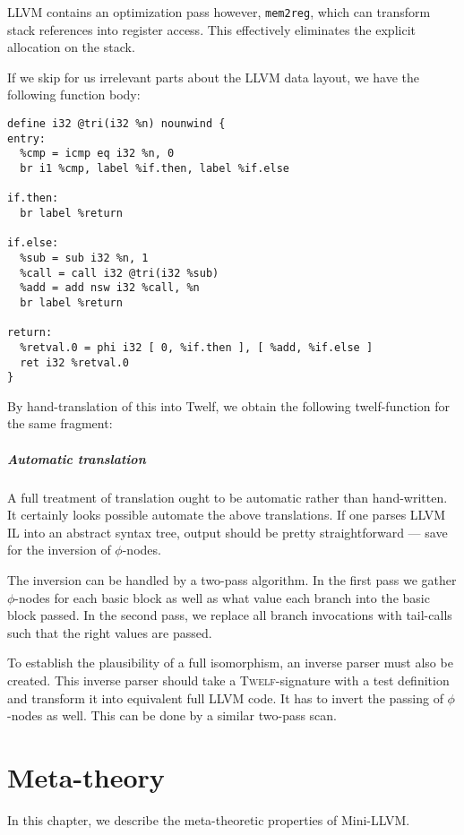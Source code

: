 \documentclass[a4paper, oneside, 10pt, draft]{memoir}
\newcommand{\twelf}{\textsc{Twelf}}
\begin{document}
LLVM contains an optimization pass however, \texttt{mem2reg}, which
can transform stack references into register access. This effectively
eliminates the explicit allocation on the stack.

If we skip for us irrelevant parts about the LLVM data layout, we have
the following function body:
\begin{verbatim}
define i32 @tri(i32 %n) nounwind {
entry:
  %cmp = icmp eq i32 %n, 0
  br i1 %cmp, label %if.then, label %if.else

if.then:
  br label %return

if.else:
  %sub = sub i32 %n, 1
  %call = call i32 @tri(i32 %sub)
  %add = add nsw i32 %call, %n
  br label %return

return:
  %retval.0 = phi i32 [ 0, %if.then ], [ %add, %if.else ]
  ret i32 %retval.0
}
\end{verbatim}
By hand-translation of this into Twelf, we obtain the following
twelf-function for the same fragment:
\paragraph{Automatic translation}

A full treatment of translation ought to be automatic rather than
hand-written. It certainly looks possible automate the above
translations. If one parses LLVM IL into an abstract syntax tree,
output should be pretty straightforward --- save for the inversion of
$\phi$-nodes.

The inversion can be handled by a two-pass algorithm. In the first
pass we gather $\phi$-nodes for each basic block as well as what value
each branch into the basic block passed. In the second pass, we
replace all branch invocations with tail-calls such that the right
values are passed.

To establish the plausibility of a full isomorphism, an inverse parser
must also be created. This inverse parser should take a
\twelf{}-signature with a test definition and transform it into
equivalent full LLVM code. It has to invert the passing of
$\phi$-nodes as well. This can be done by a similar two-pass scan.

\chapter{Meta-theory}

In this chapter, we describe the meta-theoretic properties of
Mini-LLVM.
\end{document}
